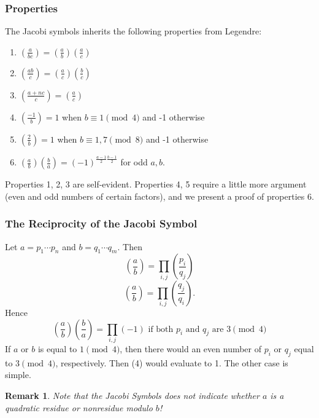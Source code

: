 \documentclass[12pt]{article}
\newtheorem*{remark}{Remark}
\newcommand{\jacobi}[2]{\genfrac{(}{)}{}{}{#1}{#2}}
\begin{document}
\subsubsection{Properties}
The Jacobi symbols inherits the following properties from Legendre:
\begin{enumerate}
    \item $\jacobi{a}{bc} = \jacobi{a}{b}\jacobi{a}{c}$
    \item $\jacobi{ab}{c} = \jacobi{a}{c}\jacobi{b}{c}$
    \item $\jacobi{a+nc}{c} = \jacobi{a}{c}$
    \item $\jacobi{-1}{b} = 1$ when $b \equiv 1 \pmod{4}$ and -1 otherwise
    \item $\jacobi{2}{b} = 1$ when $b \equiv 1, 7 \pmod{8}$ and -1 otherwise
    \item $\jacobi{a}{b}\jacobi{b}{a} = (-1)^{\frac{a-1}{2}\frac{b-1}{2}}$ for odd $a,b$.
\end{enumerate}
Properties 1, 2, 3 are self-evident. Properties 4, 5 require a little more argument (even and odd numbers of certain factors), and we present a proof of properties 6.

\subsubsection{The Reciprocity of the Jacobi Symbol}
Let $a = p_{1}\cdots p_{n}$ and $b = q_{1}\cdots q_{m}$. Then
\begin{equation}
    \jacobi{a}{b} = \prod_{i,j}\jacobi{p_{i}}{q_{j}}
\end{equation}
\begin{equation}
    \jacobi{a}{b} = \prod_{i,j}\jacobi{q_{j}}{q_{i}}.
\end{equation}
Hence
\begin{equation}
    \jacobi{a}{b}\jacobi{b}{a} = \prod_{i,j}(-1) \textrm{ if both $p_{i}$ and $q_{j}$ are }3\pmod{4}
\end{equation}
If $a$ or $b$ is equal to $1 \pmod{4}$, then there would an even number of $p_{i}$ or $q_{j}$ equal to $3 \pmod{4}$, respectively. Then (4) would evaluate to 1. The other case is simple.
\begin{remark}
    Note that the Jacobi Symbols does not indicate whether $a$ is a quadratic residue or nonresidue modulo $b$!
\end{remark}
\end{document}
